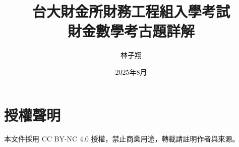 \documentclass[12pt,a4paper]{article}
\title{台大財金所財務工程組入學考試\\財金數學考古題詳解}
\author{林子翔}
\date{2025年8月}
\begin{document}
\maketitle
\tableofcontents
\newpage

\section*{授權聲明}
本文件採用 CC BY-NC 4.0 授權，禁止商業用途，轉載請註明作者與來源。

\newpage


% 
% 
\end{document}
